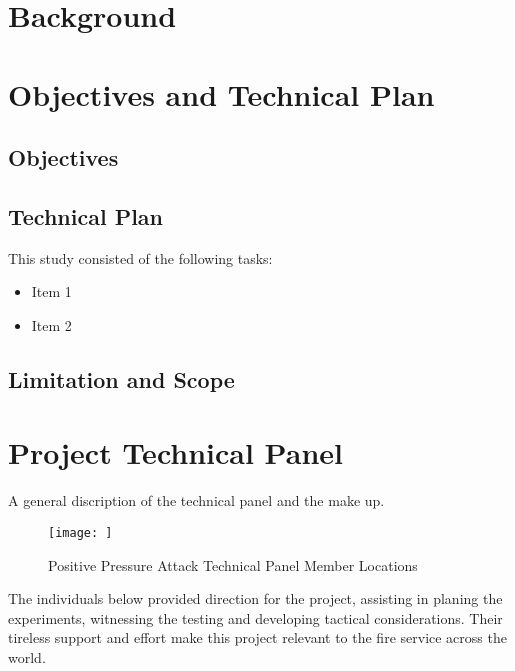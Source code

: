 \documentclass{article}
\begin{document}
\clearpage

\section{Background}

\clearpage

\section{Objectives and Technical Plan}

\subsection {Objectives}



\subsection{Technical Plan}

This study consisted of the following tasks:

\begin{itemize}
	\item Item 1
	\item Item 2
\end{itemize}

\subsection{Limitation and Scope}

\clearpage

\section{Project Technical Panel}

A general discription of the technical panel and the make up.

\begin{figure}[H]
	\centering
	\texttt{[image: ]} 
	\caption{Positive Pressure Attack Technical Panel Member Locations}
	\label{fig:PanelLocatoins}
\end{figure} 

The individuals below provided direction for the project, assisting in planing the experiments, witnessing the testing and developing tactical considerations. Their tireless support and effort make this project relevant to the fire service across the world. 
\end{document}
